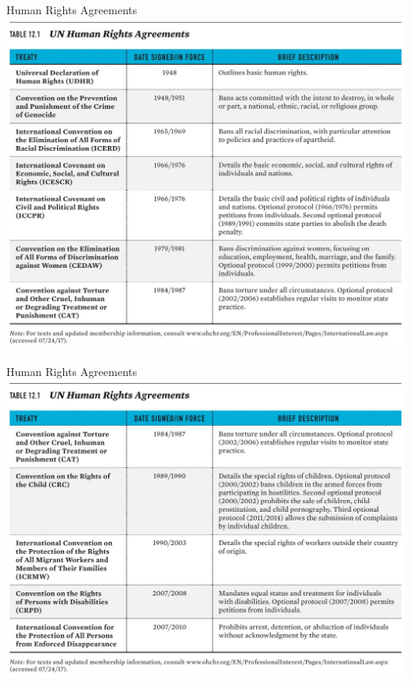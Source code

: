 \documentclass{beamer}
\begin{document}
\begin{frame}{\LARGE Human Rights Agreements}
	\centering
	\includegraphics[width=\textwidth,height=0.9\textheight,keepaspectratio]{UNHR1.jpg}
\end{frame}

\begin{frame}{\LARGE Human Rights Agreements}
	\centering
	\includegraphics[width=\textwidth,height=0.9\textheight,keepaspectratio]{UNHR2.jpg}
\end{frame}
\end{document}
